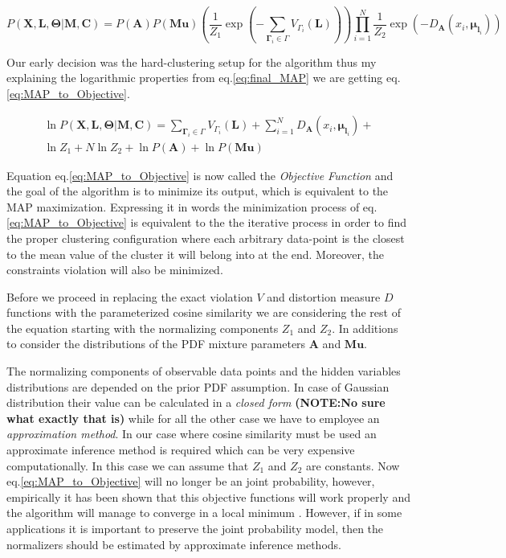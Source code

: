 \documentclass[dvips,dvipdfm,pdftex]{llncs}
\begin{document}
\begin{equation}
	P(\mathbf{X,L,\Theta}|\mathbf{M,C})=P(\mathbf{A})P(\mathbf{Mu})(\frac{1}{Z_{1}}\exp(-\sum_{\mathbf{\Gamma}_{i}\in\Gamma}V_{\Gamma_{i}}(\mathbf{L})))\prod_{i=1}^{N}\frac{1}{Z_{2}}\exp(-D_{\mathbf{A}}(x_{i},\mathbf{\mu}_{\mathbf{l}_{i}}))
\label{eq:final_MAP}
\end{equation}


Our early decision was the hard-clustering setup for the algorithm thus my explaining the logarithmic properties from eq.\ref{eq:final_MAP} we are getting eq.\ref{eq:MAP_to_Objective}.

\begin{equation}
	\begin{split}
		\ln P(\mathbf{X,L,\Theta}|\mathbf{M,C})=\sum_{\mathbf{\Gamma}_{i}\in\Gamma}V_{\Gamma_{i}}(\mathbf{L})+\sum_{i=1}^{N}D_{\mathbf{A}}(x_{i},\mathbf{\mu}_{\mathbf{l}_{i}})+ \\
		\ln Z_{1}+N\ln Z_{2}+\ln P(\mathbf{A})+\ln P(\mathbf{Mu})
	\end{split}
\label{eq:MAP_to_Objective}
\end{equation}

Equation eq.\ref{eq:MAP_to_Objective} is now called the \emph{Objective Function} and the goal of the algorithm is to minimize its output, which is equivalent to the MAP maximization. Expressing it in words the minimization process of eq.\ref{eq:MAP_to_Objective} is equivalent to the the iterative process in order to find the proper clustering configuration where each arbitrary data-point is the closest to the mean value of the cluster it will belong into at the end. Moreover, the constraints violation will also be minimized.

Before we proceed in replacing the exact violation $V$ and distortion measure $D$ functions with the parameterized cosine similarity we are considering the rest of the equation starting with the normalizing components $Z_{1}$ and $Z_{2}$. In additions to consider the distributions of the PDF mixture parameters $\mathbf{A}$ and $\mathbf{Mu}$.

The normalizing components of observable data points and the hidden variables distributions are depended on the prior PDF assumption. In case of Gaussian distribution their value can be calculated in a \emph{closed form} \textbf{(NOTE:No sure what exactly that is)} while for all the other case we have to employee an \emph{approximation method}. In our case where cosine similarity must be used an approximate inference method is required which can be very expensive computationally. In this case we can assume that $Z_{1}$ and $Z_{2}$ are constants. Now eq.\ref{eq:MAP_to_Objective} will no longer be an joint probability, however, empirically it has been shown that this objective functions will work properly and the algorithm will manage to converge in a local minimum \cite{basu2004probabilistic}. However, if in some applications it is important to preserve the joint probability model, then the normalizers should be estimated by approximate inference methods.
\end{document}

